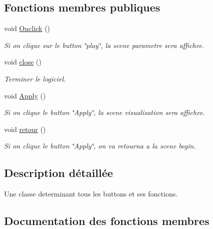 \subsection*{Fonctions membres publiques}
\begin{DoxyCompactItemize}
\item 
void \mbox{\hyperlink{class_play_button_ae50ebca92c570fc8eb2cdaa79eff1865}{Onclick}} ()
\begin{DoxyCompactList}\small\item\em Si on clique sur le button \char`\"{}play\char`\"{}, la scene parametre sera affichee. \end{DoxyCompactList}\item 
void \mbox{\hyperlink{class_play_button_a53fd8894bbfa2d9ee15aab0d619e2bf0}{close}} ()
\begin{DoxyCompactList}\small\item\em Terminer le logiciel. \end{DoxyCompactList}\item 
void \mbox{\hyperlink{class_play_button_aeb219e1c299a10bfe56234689cc9baf5}{Apply}} ()
\begin{DoxyCompactList}\small\item\em Si on clique le button \char`\"{}\+Apply\char`\"{}, la scene visualisation sera affichee. \end{DoxyCompactList}\item 
void \mbox{\hyperlink{class_play_button_ac5294990a15a4265444183ddf5fa2c58}{retour}} ()
\begin{DoxyCompactList}\small\item\em Si on clique le button \char`\"{}\+Apply\char`\"{}, on va retourna a la scene begin. \end{DoxyCompactList}\end{DoxyCompactItemize}


\subsection{Description détaillée}
Une classe determinant tous les buttons et ses fonctions. 



\subsection{Documentation des fonctions membres}
\mbox{\label{class_play_button_aeb219e1c299a10bfe56234689cc9baf5}} 
